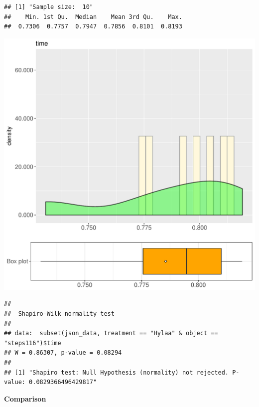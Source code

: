 \documentclass{article}\usepackage[]{graphicx}\usepackage[]{color}
\makeatletter
\def\maxwidth{ %
  \ifdim\Gin@nat@width>\linewidth
    \linewidth
  \else
    \Gin@nat@width
  \fi
}
\newenvironment{kframe}{%
 \def\at@end@of@kframe{}%
 \ifinner\ifhmode%
  \def\at@end@of@kframe{\end{minipage}}%
  \begin{minipage}{\columnwidth}%
 \fi\fi%
 \def\FrameCommand##1{\hskip\@totalleftmargin \hskip-\fboxsep
 \colorbox{shadecolor}{##1}\hskip-\fboxsep
     \hskip-\linewidth \hskip-\@totalleftmargin \hskip\columnwidth}%
 \MakeFramed {\advance\hsize-\width
   \@totalleftmargin\z@ \linewidth\hsize
   \@setminipage}}%
 {\par\unskip\endMakeFramed%
 \at@end@of@kframe}
\newenvironment{knitrout}{}{} %
\makeatother
\begin{document}
\begin{knitrout}
\color{fgcolor}\begin{kframe}
\begin{verbatim}
## [1] "Sample size:  10"
##    Min. 1st Qu.  Median    Mean 3rd Qu.    Max. 
##  0.7306  0.7757  0.7947  0.7856  0.8101  0.8193
\end{verbatim}
\end{kframe}
\includegraphics[width=\maxwidth]{figure/RH2_Hylaa_steps116-1} 
\begin{kframe}\begin{verbatim}
## 
## 	Shapiro-Wilk normality test
## 
## data:  subset(json_data, treatment == "Hylaa" & object == "steps116")$time
## W = 0.86307, p-value = 0.08294
## 
## [1] "Shapiro test: Null Hypothesis (normality) not rejected. P-value: 0.0829366496429817"
\end{verbatim}
\end{kframe}
\end{knitrout}
  
 \textbf{Comparison}
  
\end{document}
